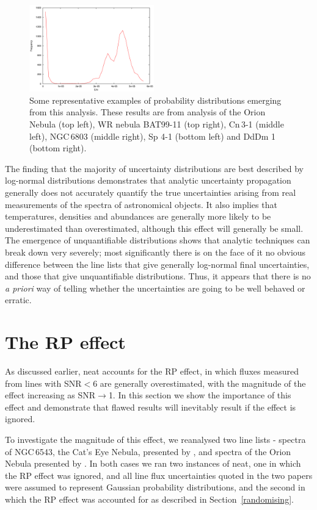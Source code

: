 \documentclass[useAMS,usenatbib]{mn2e}
\begin{document}
\begin{figure}
\includegraphics[width=0.48\textwidth]{figures/plot_binned_DdDm1-3_S_abund_CEL.png}
\caption{Some representative examples of probability distributions emerging from this analysis.  These results are from analysis of the Orion Nebula (top left), WR nebula BAT99-11 (top right), Cn\,3-1 (middle left), NGC\,6803 (middle right), Sp 4-1 (bottom left) and DdDm 1 (bottom right).}
\label{Typical_uncertainties_images}
\end{figure}

The finding that the majority of uncertainty distributions are best described by log-normal distributions demonstrates that analytic uncertainty propagation generally does not accurately quantify the true uncertainties arising from real measurements of the spectra of astronomical objects.  It also implies that temperatures, densities and abundances are generally more likely to be underestimated than overestimated, although this effect will generally be small.  The emergence of unquantifiable distributions shows that analytic techniques can break down very severely; most significantly there is on the face of it no obvious difference between the line lists that give generally log-normal final uncertainties, and those that give unquantifiable distributions.  Thus, it appears that there is no {\it a priori} way of telling whether the uncertainties are going to be well behaved or erratic.

\section{The RP effect}
\label{RPeffect}

As discussed earlier, {\sc neat} accounts for the RP effect, in which fluxes measured from lines with SNR$<$6 are generally overestimated, with the magnitude of the effect increasing as SNR$\to$1.  In this section we show the importance of this effect and demonstrate that flawed results will inevitably result if the effect is ignored.

To investigate the magnitude of this effect, we reanalysed two line lists - spectra of NGC\,6543, the Cat's Eye Nebula, presented by \citet{2004MNRAS.351.1026W}, and spectra of the Orion Nebula presented by \citet{2004MNRAS.355..229E}.  In both cases we ran two instances of {\sc neat}, one in which the RP effect was ignored, and all line flux uncertainties quoted in the two papers were assumed to represent Gaussian probability distributions, and the second in which the RP effect was accounted for as described in Section~\ref{randomising}.
\end{document}
